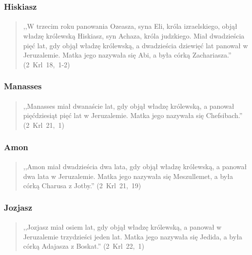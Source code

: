 \documentclass[10pt,a4paper,oneside]{article}
\begin{document}
\subsubsection{Hiskiasz}
\paragraph{}
\begin{quote}
,,W trzecim roku panowania Ozeasza, syna Eli, króla izraelskiego, objął władzę królewską Hiskiasz, syn Achaza, króla judzkiego. Miał dwadzieścia pięć lat, gdy objął władzę królewską, a dwadzieścia dziewięć lat panował w Jeruzalemie. Matka jego nazywała się Abi, a była córką Zachariasza.'' \mbox{(2 Krl 18, 1-2)}
\end{quote}
\subsubsection{Manasses}
\paragraph{}
\begin{quote}
,,Manasses miał dwanaście lat, gdy objął władzę królewską, a panował pięćdziesiąt pięć lat w Jeruzalemie. Matka jego nazywała się Chefsibach.'' \mbox{(2 Krl 21, 1)}
\end{quote}
\subsubsection{Amon}
\paragraph{}
\begin{quote}
,,Amon miał dwadzieścia dwa lata, gdy objął władzę królewską, a panował dwa lata w Jeruzalemie. Matka jego nazywała się Meszullemet, a była córką Charusa z Jotby.'' \mbox{(2 Krl 21, 19)}
\end{quote}
\subsubsection{Jozjasz}
\paragraph{}
\begin{quote}
,,Jozjasz miał osiem lat, gdy objął władzę królewską, a panował w Jeruzalemie trzydzieści jeden lat. Matka jego nazywała się Jedida, a była córką Adajasza z Boskat.'' \mbox{(2 Krl 22, 1)}
\end{quote}
\end{document}
